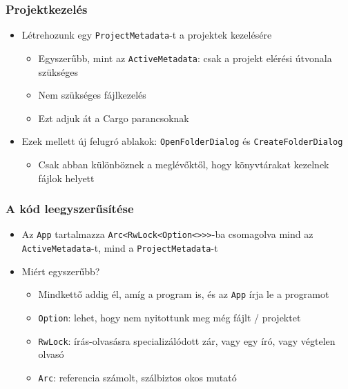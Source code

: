 \documentclass{beamer}
\begin{document}
    \begin{frame}[fragile]
        \frametitle{Projektkezelés}

        \begin{itemize}
            \item Létrehozunk egy \texttt{ProjectMetadata}-t a projektek kezelésére \begin{itemize}
                \item Egyszerűbb, mint az \texttt{ActiveMetadata}: csak a projekt elérési útvonala szükséges
                \item Nem szükséges fájlkezelés
                \item Ezt adjuk át a Cargo parancsoknak
            \end{itemize}
            \item Ezek mellett új felugró ablakok: \texttt{OpenFolderDialog} és \texttt{CreateFolderDialog} \begin{itemize}
                \item Csak abban különböznek a meglévőktől, hogy könyvtárakat kezelnek fájlok helyett
            \end{itemize}
        \end{itemize}
    \end{frame}

    \begin{frame}[fragile]
        \frametitle{A kód leegyszerűsítése}

        \begin{itemize}
            \item Az \texttt{App} tartalmazza \texttt{Arc<RwLock<Option<{}>{}>{}>}-ba csomagolva mind az \texttt{ActiveMetadata}-t, mind a \texttt{ProjectMetadata}-t
            \item Miért egyszerűbb? \begin{itemize}
                \item Mindkettő addig él, amíg a program is, és az \texttt{App} írja le a programot
                \item \texttt{Option}: lehet, hogy nem nyitottunk meg még fájlt / projektet
                \item \texttt{RwLock}: írás-olvasásra specializálódott zár, vagy egy író, vagy végtelen olvasó
                \item \texttt{Arc}: referencia számolt, szálbiztos okos mutató
            \end{itemize}
        \end{itemize}
    \end{frame}
\end{document}
